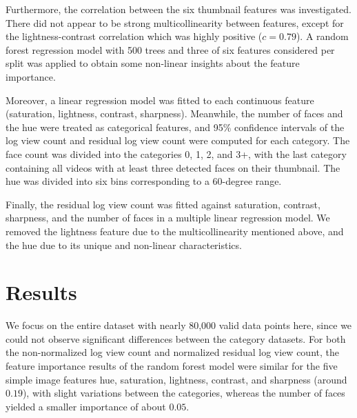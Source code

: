 \documentclass{article}
\begin{document}
Furthermore, the correlation between the six thumbnail features was investigated. There did not appear to be strong multicollinearity between features, except for the lightness-contrast correlation which was highly positive ($c = 0.79$). A random forest regression model with 500 trees and three of six features considered per split was applied to obtain some non-linear insights about the feature importance.

Moreover, a linear regression model was fitted to each continuous feature (saturation, lightness, contrast, sharpness). Meanwhile, the number of faces and the hue were treated as categorical features, and 95\% confidence intervals of the log view count and residual log view count were computed for each category. The face count was divided into the categories 0, 1, 2, and 3+, with the last category containing all videos with at least three detected faces on their thumbnail. The hue was divided into six bins corresponding to a 60-degree range.

Finally, the residual log view count was fitted against saturation, contrast, sharpness, and the number of faces in a multiple linear regression model. We removed the lightness feature due to the multicollinearity mentioned above, and the hue due to its unique and non-linear characteristics.

\section{Results}
We focus on the entire dataset with nearly 80,000 valid data points here, since we could not observe significant differences between the category datasets. For both the non-normalized log view count and normalized residual log view count, the feature importance results of the random forest model were similar for the five simple image features hue, saturation, lightness, contrast, and sharpness (around $0.19$), with slight variations between the categories, whereas the number of faces yielded a smaller importance of about $0.05$.
\end{document}
